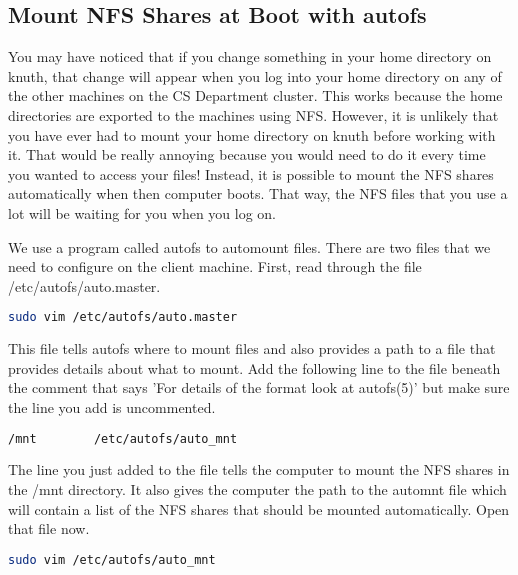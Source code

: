 \documentclass[11pt]{article}
\begin{document}
	\subsection*{Mount NFS Shares at Boot with autofs}

\indent\indent You may have noticed that if you change something in your home directory on knuth, that change will appear when you log into your home directory on any of the other machines on the CS Department cluster. This works because the home directories are exported to the machines using NFS. However, it is unlikely that you have ever had to mount your home directory on knuth before working with it. That would be really annoying because you would need to do it every time you wanted to access your files! Instead, it is possible to mount the NFS shares automatically when then computer boots. That way, the NFS files that you use a lot will be waiting for you when you log on.
	
	We use a program called autofs to automount files. 	
There are two files that we need to configure on the client machine. First, read through the file /etc/autofs/auto.master.

\begin{lstlisting}[basicstyle=\ttfamily, backgroundcolor = \color{lightgray}, language = bash, xleftmargin = 0cm, framexleftmargin = 1em]
sudo vim /etc/autofs/auto.master
\end{lstlisting} 	

This file tells autofs where to mount files and also provides a path to a file that provides details about what to mount.
Add the following line to the file beneath the comment that says  'For details of the format look at autofs(5)' but make sure the line you add is uncommented.
\begin{lstlisting}[basicstyle=\ttfamily, backgroundcolor = \color{lightgray}, language = bash, xleftmargin = 0cm, framexleftmargin = 1em]
/mnt		/etc/autofs/auto_mnt
\end{lstlisting} 	

The line you just added to the file tells the computer to mount the NFS shares in the /mnt directory. It also gives the computer the path to the auto\textunderscore mnt file which will contain a list of the NFS shares that should be mounted automatically. Open that file now.

\begin{lstlisting}[basicstyle=\ttfamily, backgroundcolor = \color{lightgray}, language = bash, xleftmargin = 0cm, framexleftmargin = 1em]
sudo vim /etc/autofs/auto_mnt
\end{lstlisting} 	
\end{document}

